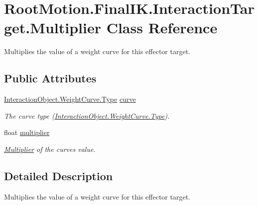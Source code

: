\hypertarget{class_root_motion_1_1_final_i_k_1_1_interaction_target_1_1_multiplier}{}\section{Root\+Motion.\+Final\+I\+K.\+Interaction\+Target.\+Multiplier Class Reference}
\label{class_root_motion_1_1_final_i_k_1_1_interaction_target_1_1_multiplier}


Multiplies the value of a weight curve for this effector target.  


\subsection*{Public Attributes}
\begin{DoxyCompactItemize}
\item 
\mbox{\hyperlink{class_root_motion_1_1_final_i_k_1_1_interaction_object_1_1_weight_curve_a74c8be2e80ace86b130c88e275300b27}{Interaction\+Object.\+Weight\+Curve.\+Type}} \mbox{\hyperlink{class_root_motion_1_1_final_i_k_1_1_interaction_target_1_1_multiplier_a9e46f2b1ba1f186d7d166484e29ea235}{curve}}
\begin{DoxyCompactList}\small\item\em The curve type (\mbox{\hyperlink{class_root_motion_1_1_final_i_k_1_1_interaction_object_1_1_weight_curve_a74c8be2e80ace86b130c88e275300b27}{Interaction\+Object.\+Weight\+Curve.\+Type}}). \end{DoxyCompactList}\item 
float \mbox{\hyperlink{class_root_motion_1_1_final_i_k_1_1_interaction_target_1_1_multiplier_a28842c679c51f5f7ffdbe72e83994978}{multiplier}}
\begin{DoxyCompactList}\small\item\em \mbox{\hyperlink{class_root_motion_1_1_final_i_k_1_1_interaction_target_1_1_multiplier}{Multiplier}} of the curve\textquotesingle{}s value. \end{DoxyCompactList}\end{DoxyCompactItemize}


\subsection{Detailed Description}
Multiplies the value of a weight curve for this effector target. 



